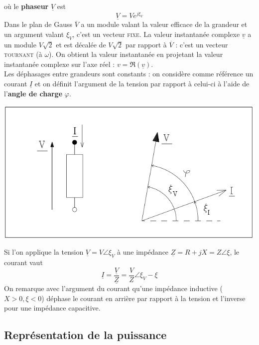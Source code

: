 où le \textbf{phaseur} $\underline{V}$ est 
\begin{equation}
	\underline{V} = Ve^{j\xi_V}
\end{equation}
Dans le plan de Gauss $\overline{V}$ a un module valant la valeur efficace 
de la grandeur et un argument valant $\xi_V$, c'est un vecteur \textsc{fixe}.
La valeur instantanée complexe $\underline{v}$ a un module $V\sqrt{2}$ et est 
décalée de $V\sqrt{2}$ par rapport à $\overline{V}$ : c'est un vecteur 
\textsc{tournant} (à $\omega$). On obtient la valeur instantanée en projetant 
la valeur instantanée complexe sur l'axe réel : $v = \Re(\underline{v})$.\\
	
Les déphasages entre grandeurs sont constants : on considère comme référence un 
courant $\underline{I}$ et on définit l'argument de la tension par rapport à 
celui-ci à l'aide de l'\textbf{angle de charge} $\varphi$.
	
\begin{center}
	\includegraphics[scale=0.4]{ch1/image3.png}
\end{center}	
		
Si l'on applique la tension $\underline{V} = V\angle \xi_V$ à une impédance 
$\underline{Z} = R + jX = Z\angle \xi$, le courant vaut 
\begin{equation}
	\underline{I} = \frac{\underline{V}}{\underline{Z}} = \frac{V}{Z}\angle 
	\xi_V-\xi
\end{equation}
On remarque avec l'argument du courant qu'une impédance inductive ($X>0, 
\xi <0$) déphase le courant en arrière par rapport à la tension et l'inverse 
pour une impédance capacitive.
	
	
\subsection{Représentation de la puissance}
